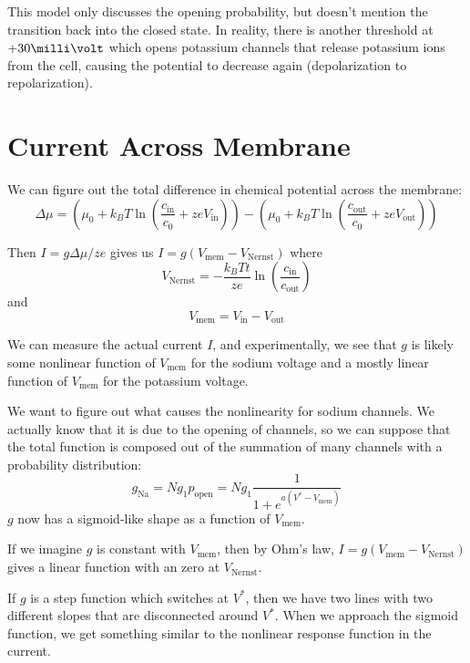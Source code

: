 \documentclass[a4paper,twoside,master.tex]{subfiles}
\begin{document}
This model only discusses the opening probability, but doesn't mention the transition back into the closed state. In reality, there is another threshold at $ +30\milli\volt $ which opens potassium channels that release potassium ions from the cell, causing the potential to decrease again (depolarization to repolarization).


\section{Current Across Membrane}\label{sec:current_across_membrane}

We can figure out the total difference in chemical potential across the membrane:
\begin{equation}
    \Delta \mu = \left( \mu_0 + k_B T \ln(\frac{c_{\text{in}}}{c_0} + z e V_{\text{in}}) \right) - \left( \mu_0 + k_B T \ln(\frac{c_{\text{out}}}{c_0} + z e V_{\text{out}}) \right)
\end{equation}

Then $ I = g \Delta \mu / ze $ gives us $ I = g(V_{\text{mem}} - V_{\text{Nernst}}) $ where
\begin{equation}
    V_{\text{Nernst}} = - \frac{k_B Tt}{ze} \ln(\frac{c_{\text{in}}}{c_{\text{out}}})
\end{equation}
and
\begin{equation}
    V_{\text{mem}} = V_{\text{in}} - V_{\text{out}}
\end{equation}

We can measure the actual current $ I $, and experimentally, we see that $ g $ is likely some nonlinear function of $ V_{\text{mem}} $ for the sodium voltage and a mostly linear function of $ V_{\text{mem}} $ for the potassium voltage.

We want to figure out what causes the nonlinearity for sodium channels. We actually know that it is due to the opening of channels, so we can suppose that the total function is composed out of the summation of many channels with a probability distribution:
\begin{equation}
    g_{\text{Na}} = N g_1 p_{\text{open}} = N g_1 \frac{1}{1 + e^{a(V^* - V_{\text{mem}})}}
\end{equation}
$ g $ now has a sigmoid-like shape as a function of $ V_{\text{mem}} $.

If we imagine $ g $ is constant with $ V_{\text{mem}} $, then by Ohm's law, $ I = g (V_{\text{mem}} - V_{\text{Nernst}}) $ gives a linear function with an zero at $ V_{\text{Nernst}} $.

If $ g $ is a step function which switches at $ V^* $, then we have two lines with two different slopes that are disconnected around $ V^* $. When we approach the sigmoid function, we get something similar to the nonlinear response function in the current.
\end{document}
